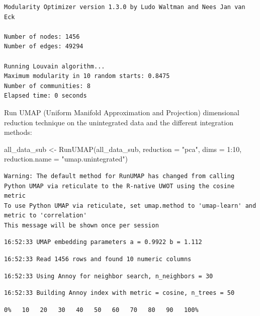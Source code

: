 \documentclass[
  letterpaper,
  DIV=11,
  numbers=noendperiod]{scrreprt}
\newenvironment{Shaded}{\begin{snugshade}}{\end{snugshade}}
\newcommand{\AttributeTok}[1]{\textcolor[rgb]{0.40,0.45,0.13}{#1}}
\newcommand{\DecValTok}[1]{\textcolor[rgb]{0.68,0.00,0.00}{#1}}
\newcommand{\FunctionTok}[1]{\textcolor[rgb]{0.28,0.35,0.67}{#1}}
\newcommand{\NormalTok}[1]{\textcolor[rgb]{0.00,0.23,0.31}{#1}}
\newcommand{\OtherTok}[1]{\textcolor[rgb]{0.00,0.23,0.31}{#1}}
\newcommand{\SpecialCharTok}[1]{\textcolor[rgb]{0.37,0.37,0.37}{#1}}
\newcommand{\StringTok}[1]{\textcolor[rgb]{0.13,0.47,0.30}{#1}}
\begin{document}
\begin{verbatim}
Modularity Optimizer version 1.3.0 by Ludo Waltman and Nees Jan van Eck

Number of nodes: 1456
Number of edges: 49294

Running Louvain algorithm...
Maximum modularity in 10 random starts: 0.8475
Number of communities: 8
Elapsed time: 0 seconds
\end{verbatim}

Run UMAP (Uniform Manifold Approximation and Projection) dimensional
reduction technique on the unintegrated data and the different
integration methods:

\begin{Shaded}
\begin{Highlighting}[]
\NormalTok{all\_data\_sub }\OtherTok{\textless{}{-}} \FunctionTok{RunUMAP}\NormalTok{(all\_data\_sub, }\AttributeTok{reduction =} \StringTok{"pca"}\NormalTok{, }\AttributeTok{dims =} \DecValTok{1}\SpecialCharTok{:}\DecValTok{10}\NormalTok{, }\AttributeTok{reduction.name =} \StringTok{"umap.unintegrated"}\NormalTok{)}
\end{Highlighting}
\end{Shaded}

\begin{verbatim}
Warning: The default method for RunUMAP has changed from calling Python UMAP via reticulate to the R-native UWOT using the cosine metric
To use Python UMAP via reticulate, set umap.method to 'umap-learn' and metric to 'correlation'
This message will be shown once per session
\end{verbatim}

\begin{verbatim}
16:52:33 UMAP embedding parameters a = 0.9922 b = 1.112
\end{verbatim}

\begin{verbatim}
16:52:33 Read 1456 rows and found 10 numeric columns
\end{verbatim}

\begin{verbatim}
16:52:33 Using Annoy for neighbor search, n_neighbors = 30
\end{verbatim}

\begin{verbatim}
16:52:33 Building Annoy index with metric = cosine, n_trees = 50
\end{verbatim}

\begin{verbatim}
0%   10   20   30   40   50   60   70   80   90   100%
\end{verbatim}
\end{document}

